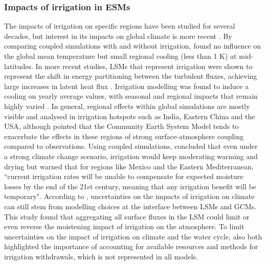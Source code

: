 \subsubsection*{Impacts of irrigation in ESMs}

The impacts of irrigation on specific regions have been studied for several decades, but interest in its impacts on global climate is more recent \citep{boucher_direct_2004}. By comparing coupled simulations with and without irrigation, \citet{sacks_effects_2009} found no influence on the global mean temperature but small regional cooling (less than 1 K) at mid-latitudes. 
In more recent studies, LSMs that represent irrigation were shown to represent the shift in energy partitioning between the turbulent fluxes, achieving large increases in latent heat flux \citep{pokhrel_incorporating_2012, al-yaari_role_2022, arboleda-obando_validation_2024}. 
Irrigation modelling was found to induce a cooling on yearly average values, with seasonal and regional impacts that remain highly varied \citep{puma_effects_2010, cook_irrigation_2015}. 
In general, regional effects within global simulations are mostly visible and analysed in irrigation hotspots such as India, Eastern China and the USA, although \citet{chen_global_2019} pointed that the Community Earth System Model \citep[CESM, ][]{danabasoglu_community_2020} tends to exacerbate the effects in these regions of strong surface-atmosphere coupling compared to observations. 
Using coupled simulations, \citet{cook_divergent_2020} concluded that even under a strong climate change scenario, irrigation would keep moderating warming and drying but warned that for regions like Mexico and the Eastern Mediterranean, ``current irrigation rates will be unable to compensate for expected moisture losses by the end of the 21st century, meaning that any irrigation benefit will be temporary".
According to \citet{de_vrese_uncertainties_2018}, uncertainties on the impacts of irrigation on climate can still stem from modelling choices at the interface between LSMs and GCMs. 
This study found that aggregating all surface fluxes in the LSM could limit or even reverse the moistening impact of irrigation on the atmosphere.
To limit uncertainties on the impact of irrigation on climate and the water cycle, \citet{de_vrese_uncertainties_2018, cook_divergent_2020} also both highlighted the importance of accounting for available resources and methods for irrigation withdrawals, which is not represented in all models.

